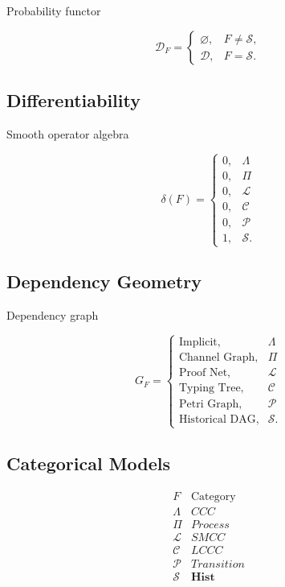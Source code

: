 \documentclass[12pt,oneside]{article}
\theoremstyle{definition}
\theoremstyle{remark}
\begin{document}
Probability functor

\[
\mathcal D_F
=
\begin{cases}
\varnothing,&F\neq\mathcal S,\\
\mathcal D,&F=\mathcal S.
\end{cases}
\]

\subsection*{Differentiability}

Smooth operator algebra

\[
\delta(F)
=
\begin{cases}
0,&\Lambda\\
0,&\Pi\\
0,&\mathcal L\\
0,&\mathcal C\\
0,&\mathcal P\\
1,&\mathcal S.
\end{cases}
\]

\subsection*{Dependency Geometry}

Dependency graph

\[
G_F
=
\begin{cases}
\text{Implicit},&\Lambda\\
\text{Channel Graph},&\Pi\\
\text{Proof Net},&\mathcal L\\
\text{Typing Tree},&\mathcal C\\
\text{Petri Graph},&\mathcal P\\
\text{Historical DAG},&\mathcal S.
\end{cases}
\]

\subsection*{Categorical Models}

\[
\begin{array}{c|c}
F
&
\text{Category}
\\
\hline
\Lambda
&
CCC
\\
\Pi
&
Process
\\
\mathcal L
&
SMCC
\\
\mathcal C
&
LCCC
\\
\mathcal P
&
Transition
\\
\mathcal S
&
\mathbf{Hist}
\end{array}
\]
\end{document}
